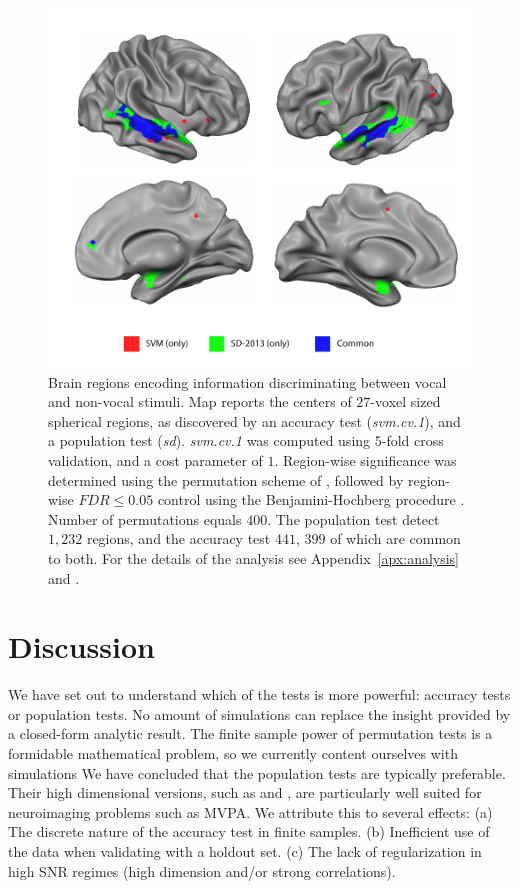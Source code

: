 \documentclass[12pt,a4paper]{article}
\theoremstyle{definition}
\begin{document}
\begin{figure}[th]
\centering
\includegraphics[width=0.7\linewidth]{"art/svm_vs_SD"}
\caption{\footnotesize
Brain regions encoding information discriminating between vocal and non-vocal stimuli.
Map reports the centers of $27$-voxel sized spherical regions, as discovered by an accuracy test (\emph{svm.cv.1}), and a population test (\emph{sd}). 
\emph{svm.cv.1} was computed using $5$-fold cross validation, and a cost parameter of $1$. 
Region-wise significance was determined using the permutation scheme of \cite{stelzer_statistical_2013}, followed by region-wise $FDR \leq 0.05$ control using the Benjamini-Hochberg procedure \citep{benjamini_controlling_1995}.
Number of permutations equals $400$.
The population test detect $1,232$ regions, and the accuracy test $441$, $399$ of which are common to both.
For the details of the analysis see Appendix~\ref{apx:analysis} and \cite{gilron_quantifying_2016}.  
  }
\label{fig:read_data}
\end{figure}








\section{Discussion}
\label{sec:discussion}

We have set out to understand which of the tests is more powerful: accuracy tests or population tests. 
No amount of simulations can replace the insight provided by a closed-form analytic result. 
The finite sample power of permutation tests is a formidable mathematical problem, so we currently content ourselves with simulations 
We have concluded that the population tests are typically preferable. 
Their high dimensional versions, such as \cite{srivastava_multivariate_2007} and \cite{schafer_shrinkage_2005},  are particularly well suited for neuroimaging problems such as MVPA.
We attribute this to several effects: \newline
(a) The discrete nature of the accuracy test in finite samples. \newline
(b) Inefficient use of the data when validating with a holdout set. \newline
(c) The lack of regularization in high SNR regimes (high dimension and\slash or strong correlations). \newline
\end{document}
